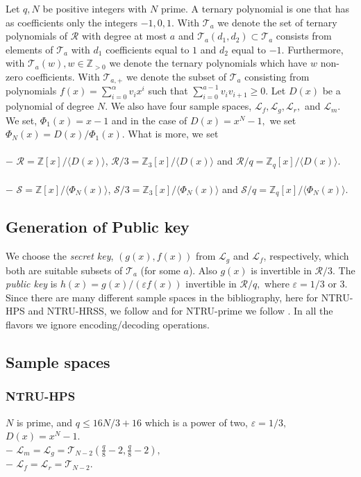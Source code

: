 \documentclass{amsart}
\numberwithin{equation}{section}
\begin{document}
{Let $q,N$ be positive integers with $N$ prime. A ternary polynomial is one that has as coefficients only the integers $-1,0,1.$  With 
${\mathcal{T}}_a$ we denote the set of ternary polynomials of ${\mathcal{R}}$ with degree at most $a$ and $\mathcal{T}_a(d_1,d_2)\subset {\mathcal{T}}_{a}$ consists from elements of ${\mathcal{T}}_{a}$ with $d_1$ coefficients equal to $1$ and $d_2$ equal to $-1.$ Furthermore, with ${\mathcal{T}}_a(w), w\in{\mathbb{Z}}_{>0}$ we denote the ternary polynomials which have $w$ non-zero coefficients. With ${\mathcal{T}}_{a,+}$ we denote the subset of ${\mathcal{T}}_a$ consisting from polynomials $f(x)=\sum_{i=0}^{\alpha}v_ix^i$ such that $\sum_{i=0}^{a-1}v_iv_{i+1}\ge 0.$	Let $D(x)$ be a polynomial of degree $N.$ We also have four sample spaces,
${\mathcal{L}}_f, {\mathcal{L}}_g, {\mathcal{L}}_r,$ and ${\mathcal{L}}_m.$
We set, $\Phi_1(x)=x-1$ and in the case of $D(x)=x^N-1,$ we set $\Phi_N(x) = D(x)/\Phi_1(x).$  
What is more, we set \\\\
$-$ ${\mathcal{R}}={\mathbb{Z}}[x]/\langle D(x) 
\rangle$, ${\mathcal{R}/3}={\mathbb{Z}}_3[x]/
\langle D(x) \rangle$ and  
${\mathcal{R}}/q={\mathbb{Z}}_q[x]/\langle D(x) 
\rangle$. \\\\
$-$ ${\mathcal{S}}={\mathbb{Z}}[x]/\langle \Phi_N(x) 
\rangle$, ${\mathcal{S}/3}={\mathbb{Z}}_3[x]/\langle \Phi_N(x)  \rangle$ 
and  ${\mathcal{S}}/q={\mathbb{Z}}_q[x]/\langle \Phi_N(x) \rangle.$
\subsection{Generation of Public key}
We choose the {\it {secret key}}, $(g(x), f(x))$ from ${\mathcal{L}}_g$ and ${\mathcal{L}}_f$, respectively, which both are suitable subsets of ${\mathcal{T}}_{a}$ (for some $a$). Also $g(x)$ is invertible in ${\mathcal{R}}/3.$  The {\it {public key}} is $h(x)=g(x)/(\varepsilon f(x))$ invertible in ${\mathcal{R}}/q,$ where $\varepsilon=1/3$ or $3.$ Since there are many different sample spaces in the bibliography, here for NTRU-HPS and NTRU-HRSS, we follow \cite{nist2-ntru} and for NTRU-prime we follow \cite{ntru-prime}. In all the flavors we ignore encoding/decoding operations.
\subsection{Sample spaces}
\subsubsection{NTRU-HPS} $N$ is prime, and $q\le 16N/3+16$ which is a power of two, $\varepsilon=1/3,$ $D(x)=x^N-1.$\\
$-$ ${\mathcal{L}}_m={\mathcal{L}}_g=
{\mathcal{T}}_{N-2}(\frac{q}{8}-2,\frac{q}{8}-2),$\\
$-$ ${\mathcal{L}}_f={\mathcal{L}}_r={\mathcal{T}}_{N-2}.$
}
\end{document}
